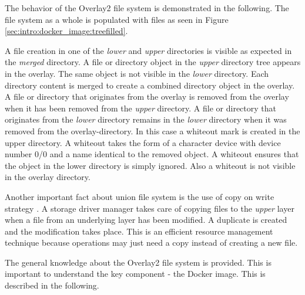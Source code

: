 The behavior of the Overlay2 file system is demonstrated in the following.
The file system as a whole is populated with files as seen in Figure \ref{sec:intro:docker_image:treefilled}.

A file creation in one of the \textit{lower} and \textit{upper} directories is visible as expected in the \textit{merged} directory.
A file or directory object in the \textit{upper} directory tree appears in the overlay. The same object is not visible in the \textit{lower} directory.
Each directory content is merged to create a combined directory object in the overlay.
A file or directory that originates from the overlay is removed from the overlay when it has been removed from the \textit{upper} directory. 
A file or directory that originates from the \textit{lower} directory remains in the \textit{lower} directory when it was removed from the overlay-directory.
In this case a whiteout mark is created in the upper directory. A whiteout takes the form of a character device with device number 0/0 and a name identical to the removed object. 
A whiteout ensures that the object in the lower directory is simply ignored. 
Also a whiteout is not visible in the overlay directory. 

Another important fact about union file system is the use of copy on write strategy \cite{cow}.
A storage driver manager takes care of copying files to the \textit{upper} layer when a file from an underlying layer has been modified. A duplicate is created and the modification takes place. This is an efficient resource management technique because operations may just need a copy instead of creating a new file.
	
The general knowledge about the Overlay2 file system is provided. This is important to understand the key component - the Docker image. This is described in the following.
